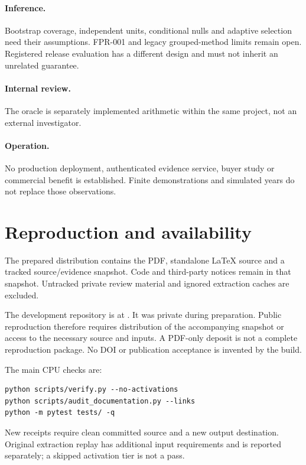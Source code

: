 \paragraph{Inference.}
Bootstrap coverage, independent units, conditional nulls and adaptive selection
need their assumptions. FPR-001 and legacy grouped-method limits remain open.
Registered release evaluation has a different design and must not inherit an
unrelated guarantee.

\paragraph{Internal review.}
The oracle is separately implemented arithmetic within the same project, not an
external investigator.

\paragraph{Operation.}
No production deployment, authenticated evidence service, buyer study or
commercial benefit is established. Finite demonstrations and simulated years do
not replace those observations.

\section{Reproduction and availability}
The prepared distribution contains the PDF, standalone LaTeX source and a
tracked source/evidence snapshot. Code and third-party notices remain in that
snapshot. Untracked private review material and ignored extraction caches are
excluded.

The development repository is at
\href{\PaperRepository}{\texttt{\PaperRepository}}.
It was private during preparation. Public reproduction
therefore requires distribution of the accompanying snapshot or access to the
necessary source and inputs. A PDF-only deposit is not a complete reproduction
package. No DOI or publication acceptance is invented by the build.

The main CPU checks are:
\begin{verbatim}
python scripts/verify.py --no-activations
python scripts/audit_documentation.py --links
python -m pytest tests/ -q
\end{verbatim}
New receipts require clean committed source and a new output destination.
Original extraction replay has additional input requirements and is reported
separately; a skipped activation tier is not a pass.

